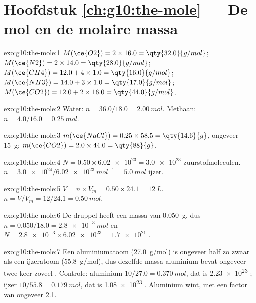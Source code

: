 \section*{Hoofdstuk \ref{ch:g10:the-mole} --- De mol en de molaire massa}

\begin{solution}{exo:g10:the-mole:1}
$M(\ce{O2}) = 2 \times 16.0 = \qty{32.0}{g/mol}$;
$M(\ce{N2}) = 2 \times 14.0 = \qty{28.0}{g/mol}$;
$M(\ce{CH4}) = 12.0 + 4 \times 1.0 = \qty{16.0}{g/mol}$;
$M(\ce{NH3}) = 14.0 + 3 \times 1.0 = \qty{17.0}{g/mol}$;
$M(\ce{CO2}) = 12.0 + 2 \times 16.0 = \qty{44.0}{g/mol}$.
\end{solution}

\begin{solution}{exo:g10:the-mole:2}
Water: $n = 36.0 / 18.0 = \qty{2.00}{mol}$. Methaan:
$n = 4.0 / 16.0 = \qty{0.25}{mol}$.
\end{solution}

\begin{solution}{exo:g10:the-mole:3}
$m(\ce{NaCl}) = 0.25 \times 58.5 = \qty{14.6}{g}$, ongeveer \qty{15}{g};
$m(\ce{CO2}) = 2.0 \times 44.0 = \qty{88}{g}$.
\end{solution}

\begin{solution}{exo:g10:the-mole:4}
$N = 0.50 \times \num{6.02e23} = \num{3.0e23}$ zuurstofmoleculen.
$n = \num{3.0e24} / \qty{6.02e23}{mol^{-1}} = \qty{5.0}{mol}$ ijzer.
\end{solution}

\begin{solution}{exo:g10:the-mole:5}
$V = n \times V_m = 0.50 \times 24.1 = \qty{12}{L}$.
$n = V / V_m = 12 / 24.1 = \qty{0.50}{mol}$.
\end{solution}

\begin{solution}{exo:g10:the-mole:6}
De druppel heeft een massa van \qty{0.050}{g}, dus
$n = 0.050 / 18.0 = \qty{2.8e-3}{mol}$ en
$N = \num{2.8e-3} \times \num{6.02e23} = \num{1.7e21}$ .
\end{solution}

\begin{solution}{exo:g10:the-mole:7}
Een aluminiumatoom (\qty{27.0}{g/mol}) is ongeveer half zo zwaar als een
ijzeratoom (\qty{55.8}{g/mol}), dus dezelfde massa aluminium bevat
ongeveer twee keer zoveel . Controle: aluminium
$10/27.0 = \qty{0.370}{mol}$, dat is \num{2.23e23} ; ijzer
$10/55.8 = \qty{0.179}{mol}$, dat is \num{1.08e23} . Aluminium wint,
met een factor van ongeveer 2.1.
\end{solution}

